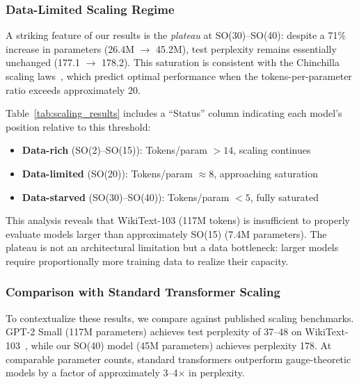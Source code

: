 \documentclass[twoside,11pt]{article}
\begin{document}
\subsubsection{Data-Limited Scaling Regime}

A striking feature of our results is the \emph{plateau} at SO(30)--SO(40): despite a 71\% increase in parameters (26.4M $\to$ 45.2M), test perplexity remains essentially unchanged (177.1 $\to$ 178.2). This saturation is consistent with the Chinchilla scaling laws~\citep{hoffmann2022training}, which predict optimal performance when the tokens-per-parameter ratio exceeds approximately 20.

Table~\ref{tab:scaling_results} includes a ``Status'' column indicating each model's position relative to this threshold:
\begin{itemize}
    \item \textbf{Data-rich} (SO(2)--SO(15)): Tokens/param $> 14$, scaling continues
    \item \textbf{Data-limited} (SO(20)): Tokens/param $\approx 8$, approaching saturation
    \item \textbf{Data-starved} (SO(30)--SO(40)): Tokens/param $< 5$, fully saturated
\end{itemize}

This analysis reveals that WikiText-103 (117M tokens) is insufficient to properly evaluate models larger than approximately SO(15) (7.4M parameters). The plateau is not an architectural limitation but a data bottleneck: larger models require proportionally more training data to realize their capacity.

\subsubsection{Comparison with Standard Transformer Scaling}

To contextualize these results, we compare against published scaling benchmarks. GPT-2 Small (117M parameters) achieves test perplexity of 37--48 on WikiText-103~\citep{radford2019language}, while our SO(40) model (45M parameters) achieves perplexity 178. At comparable parameter counts, standard transformers outperform gauge-theoretic models by a factor of approximately 3--4$\times$ in perplexity.
\end{document}
